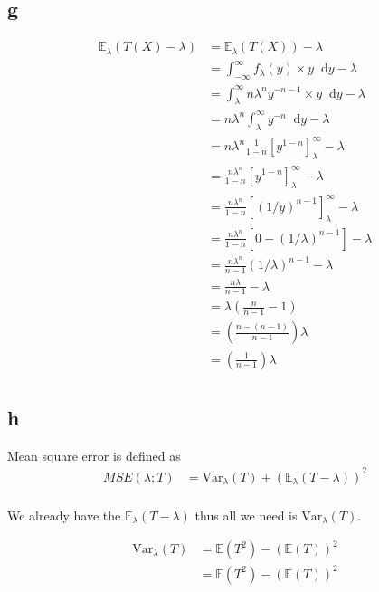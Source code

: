 \documentclass{article}
\newcommand{\diff}{\mathop{}\!\mathrm{d}}
\newcommand{\expect}{\mathbb{E}}
\newcommand{\var}{\text{Var}}
\begin{document}
\subsection{g}
\begin{align*}
    \expect_\lambda(T(X) - \lambda)
    &= \expect_\lambda(T(X)) - \lambda \\
    &= \int_{-\infty}^{\infty} f_\lambda(y) \times y \diff y - \lambda \\
    &= \int_{\lambda}^{\infty} n \lambda^n y^{-n-1} \times y \diff y - \lambda \\
    &= n \lambda^n \int_{\lambda}^{\infty} y^{-n} \diff y - \lambda \\
    &= n \lambda^n \frac{1}{1-n} \left[y^{1-n}\right]_{\lambda}^{\infty} - \lambda \\
    &= \frac{n \lambda^n}{1-n} \left[y^{1-n}\right]_{\lambda}^{\infty} - \lambda \\
    &= \frac{n \lambda^n}{1-n} \left[(1/y)^{n-1}\right]_{\lambda}^{\infty} - \lambda \\
    &= \frac{n \lambda^n}{1-n} \left[0 - (1/\lambda)^{n-1}\right] - \lambda \\
    &= \frac{n \lambda^n}{n-1} (1/\lambda)^{n-1} - \lambda \\
    &= \frac{n \lambda}{n-1} - \lambda \\
    &= \lambda \left(\frac{n}{n-1} - 1\right) \\
    &= \left(\frac{n - (n-1)}{n-1}\right)\lambda  \\
    &= \left(\frac{1}{n-1}\right)\lambda  \\
\end{align*}

\subsection{h}
Mean square error is defined as
\begin{align*}
    MSE(\lambda; T) &= \var_\lambda (T) + \left(\expect_\lambda (T - \lambda)\right)^2 \\
\end{align*}

We already have the $\expect_\lambda (T - \lambda)$
thus all we need is $\var_\lambda (T)$.

\begin{align*}
    \var_\lambda (T) &= \expect(T^2) - (\expect(T))^2 \\
    &= \expect(T^2) - (\expect(T))^2 \\
\end{align*}
\end{document}
